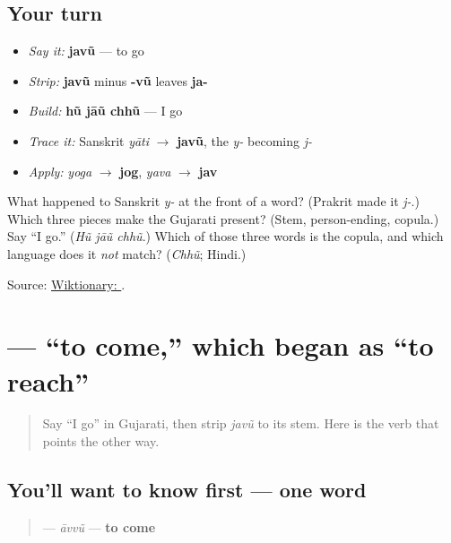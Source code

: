 \subsection*{Your turn}
\begin{itemize}
\raggedright
  \item \emph{Say it:} \textbf{javũ} — to go
  \item \emph{Strip:} \textbf{javũ} minus \textbf{-vũ} leaves \textbf{ja-}
  \item \emph{Build:} \textbf{hũ jāũ chhũ} — I go
  \item \emph{Trace it:} Sanskrit \emph{yāti} $\to$ \textbf{javũ}, the \emph{y-} becoming \emph{j-}
  \item \emph{Apply:} \emph{yoga} $\to$ \textbf{jog}, \emph{yava} $\to$ \textbf{jav}
\end{itemize}

\begin{tcolorbox}[breakable,colback=teal!4,colframe=teal!35!black,title={Before you move on}]
What happened to Sanskrit \emph{y-} at the front of a word? (Prakrit made it \emph{j-}.) Which three pieces make the Gujarati present? (Stem, person-ending, copula.) Say \textquotedblleft{}I go.\textquotedblright{} (\emph{Hũ jāũ chhũ}.) Which of those three words is the copula, and which language does it \emph{not} match? (\emph{Chhũ}; Hindi.)

Source: \href{https://en.wiktionary.org/wiki/\%E0\%AA\%9C\%E0\%AA\%B5\%E0\%AB\%81\%E0\%AA\%82}{Wiktionary: }.
\end{tcolorbox}
\section[\texorpdfstring{\gu{આવવું} (āvvũ)}{આવવું (āvvũ)}]{ — \textquotedblleft{}to come,\textquotedblright{} which began as \textquotedblleft{}to reach\textquotedblright{}}

\label{lesson:GU-C07-aavvun}



\begin{quote}
Say \textquotedblleft{}I go\textquotedblright{} in Gujarati, then strip \emph{javũ} to its stem. Here is the verb that points the other way.
\end{quote}

\subsection*{You'll want to know first — one word}
\begin{quote}
\textbf{} — \emph{āvvũ} — \textbf{to come}
\end{quote}

